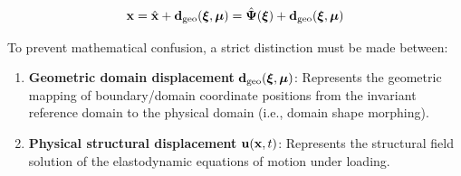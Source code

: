 \begin{equation}
    \mathbf{x} = \hat{\mathbf{x}} + \mathbf{d}_{\text{geo}}(\boldsymbol{\xi}, \boldsymbol{\mu}) = \hat{\boldsymbol{\Psi}}(\boldsymbol{\xi}) + \mathbf{d}_{\text{geo}}(\boldsymbol{\xi}, \boldsymbol{\mu})
\end{equation}

\begin{tcolorbox}[colback=lightbg, colframe=primaryblue, title=\textbf{Important Distinction: Geometric vs. Structural Displacement}, fonttitle=\bfseries]
    To prevent mathematical confusion, a strict distinction must be made between:
    \begin{enumerate}[leftmargin=*]
        \item \textbf{Geometric domain displacement} $\mathbf{d}_{\text{geo}}(\boldsymbol{\xi}, \boldsymbol{\mu})$: Represents the geometric mapping of boundary/domain coordinate positions from the invariant reference domain to the physical domain (i.e., domain shape morphing).
        \item \textbf{Physical structural displacement} $\mathbf{u}(\mathbf{x}, t)$: Represents the structural field solution of the elastodynamic equations of motion under loading.
    \end{enumerate}
\end{tcolorbox}


